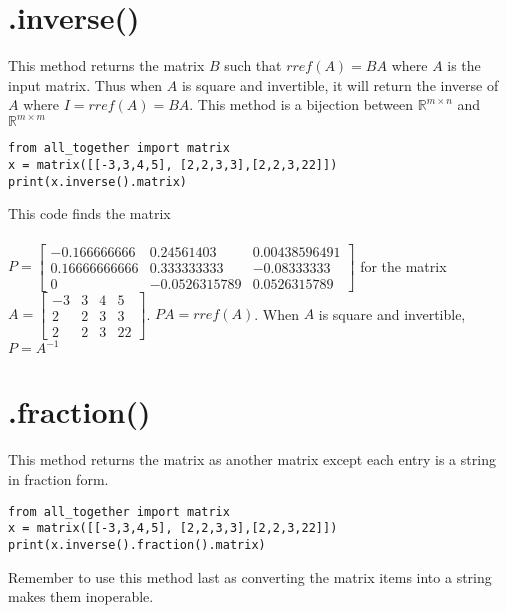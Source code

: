\documentclass{article}
\begin{document}
\section{.inverse()}
This method returns the matrix \(B\) such that \(rref(A) = BA\) where \(A\) is the input matrix.
Thus when \(A\) is square and invertible, it will return the inverse of \(A\) where \(I = rref(A) = BA\). This method is a bijection between \(\mathbb{R}^{m \times n}\) and \(\mathbb{R}^{m \times m}\)
\begin{lstlisting}
from all_together import matrix
x = matrix([[-3,3,4,5], [2,2,3,3],[2,2,3,22]])
print(x.inverse().matrix) 
\end{lstlisting}
This code finds the matrix \\ \\ \(P = \left[ \begin{array}{cccc} -0.166666666&0.24561403&0.00438596491 \\ 0.16666666666&0.333333333&-0.08333333 \\ 0&-0.0526315789&0.0526315789 \end{array}\right]\) for the matrix \(A = \left[ \begin{array}{cccc} -3&3&4&5 \\ 2&2&3&3 \\ 2&2&3&22 \end{array}\right]\). \(PA = rref(A)\). When \(A\) is square and invertible,  \(P = A^{-1}\)

\section{.fraction()}
This method returns the matrix as another matrix except each entry is a string in fraction form. 
\begin{lstlisting}
from all_together import matrix
x = matrix([[-3,3,4,5], [2,2,3,3],[2,2,3,22]])
print(x.inverse().fraction().matrix) 
\end{lstlisting}
Remember to use this method last as converting the matrix items into a string makes them inoperable.
\end{document}
